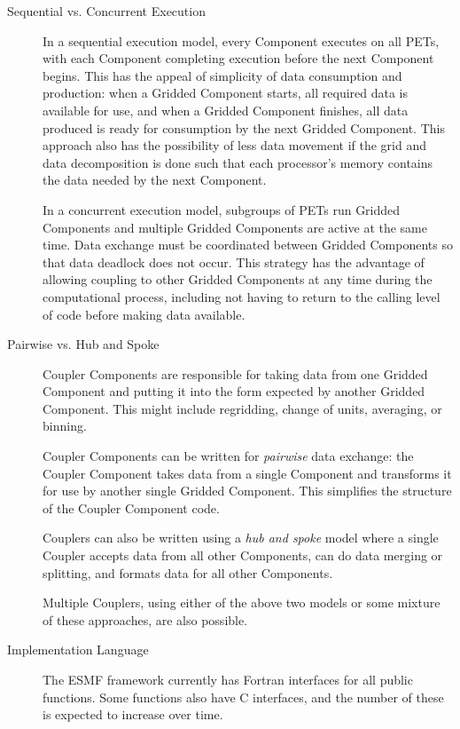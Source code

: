 \begin{description}

\item[Sequential vs. Concurrent Execution]

In a sequential execution model, every Component executes
on all PETs, with each Component completing execution before
the next Component begins.  This has the appeal of 
simplicity of data consumption and production: when a Gridded 
Component starts, all required data is available for use, and when
a Gridded Component finishes, all data produced is ready for consumption
by the next Gridded Component.  This approach also has
the possibility of less data movement if the grid and
data decomposition is done such that each processor's memory contains
the data needed by the next Component.

In a concurrent execution model, subgroups of PETs run
Gridded Components and multiple Gridded Components are active at the 
same time.  Data exchange must be coordinated between Gridded 
Components so that data deadlock does not occur.  This strategy 
has the advantage of allowing coupling to other Gridded Components 
at any time during the computational process, including not 
having to return to the calling level of code before making 
data available.  

\item[Pairwise vs. Hub and Spoke]

Coupler Components are responsible for taking data from one
Gridded Component and putting it into the form expected by another 
Gridded Component.  This might include regridding, change of units, 
averaging, or binning.

Coupler Components can be written for {\it pairwise} data exchange: 
the Coupler Component takes data from a single Component and transforms 
it for use by another single Gridded Component.  This simplifies the 
structure of the Coupler Component code.

Couplers can also be written using a {\it hub and spoke} model where a
single Coupler accepts data from all other Components, can do data
merging or splitting, and formats data for all other Components.

Multiple Couplers, using either of the above two models or some mixture of
these approaches, are also possible.

\item[Implementation Language]

The ESMF framework currently has Fortran interfaces for all public functions. 
Some functions also have C interfaces, and the number of these is expected to 
increase over time. 



\end{description}

